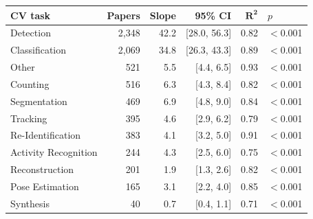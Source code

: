 \begin{tabular}{lrrrrl}
\toprule
\textbf{CV task} & \textbf{Papers} & \textbf{Slope} & \textbf{95\% CI} & $\mathbf{R^2}$ & \textbf{$p$} \\
\midrule
Detection & 2,348 & 42.2 & [28.0, 56.3] & 0.82 & $<$0.001 \\
Classification & 2,069 & 34.8 & [26.3, 43.3] & 0.89 & $<$0.001 \\
Other & 521 & 5.5 & [4.4, 6.5] & 0.93 & $<$0.001 \\
Counting & 516 & 6.3 & [4.3, 8.4] & 0.82 & $<$0.001 \\
Segmentation & 469 & 6.9 & [4.8, 9.0] & 0.84 & $<$0.001 \\
Tracking & 395 & 4.6 & [2.9, 6.2] & 0.79 & $<$0.001 \\
Re-Identification & 383 & 4.1 & [3.2, 5.0] & 0.91 & $<$0.001 \\
Activity Recognition & 244 & 4.3 & [2.5, 6.0] & 0.75 & $<$0.001 \\
Reconstruction & 201 & 1.9 & [1.3, 2.6] & 0.82 & $<$0.001 \\
Pose Estimation & 165 & 3.1 & [2.2, 4.0] & 0.85 & $<$0.001 \\
Synthesis & 40 & 0.7 & [0.4, 1.1] & 0.71 & $<$0.001 \\
\bottomrule
\end{tabular}